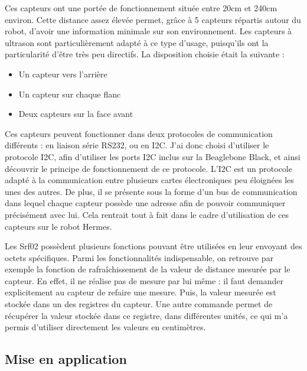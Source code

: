 \documentclass{report}
\begin{document}
        {Ces capteurs ont une portée de fonctionnement située entre 20cm et 240cm
        environ. Cette distance assez élevée permet, grâce à 5 capteurs répartis
        autour du robot, d'avoir une information minimale sur son environnement. Les
        capteurs à ultrason sont particulièrement adapté à ce type d'usage, puisqu'ils
        ont la particularité d'être très peu directifs. La disposition choisie était
        la suivante :}

        \begin{itemize}
          \item Un capteur vers l'arrière
          \item Un capteur sur chaque flanc
          \item Deux capteurs sur la face avant
        \end{itemize}

        {Ces capteurs peuvent fonctionner dans deux protocoles de communication
        différents : en liaison série RS232, ou en I2C. J'ai donc choisi d'utiliser le
        protocole I2C, afin d'utiliser les ports I2C inclus sur la Beaglebone Black, et
         ainsi découvrir le principe de fonctionnement de ce protocole. L'I2C est un
         protocole adapté à la communication entre plusieurs cartes électroniques
        peu éloignées les unes des autres. De plus, il se présente sous la forme d'un
        bus de communication dans lequel chaque capteur possède une adresse afin de
        pouvoir communiquer précisément avec lui. Cela rentrait tout à fait dans le cadre
        d'utilisation de ces capteurs sur le robot Hermes.}

        {Les Srf02 possèdent plusieurs fonctions pouvant être utilisées
        en leur envoyant des octets spécifiques. Parmi les fonctionnalités
        indispensable, on retrouve par exemple la fonction de rafraîchissement
        de la valeur de distance mesurée par le capteur. En effet, il ne réalise
        pas de mesure par lui même : il faut demander explicitement au capteur
        de refaire une mesure. Puis, la valeur mesurée est stockée dans un des
        registres du capteur. Une autre commande permet de récupérer la valeur
        stockée dans ce registre, dans différentes unités, ce qui m'a permis
        d'utiliser directement les valeurs en centimètres.}

        \subsection{Mise en application}
\end{document}
